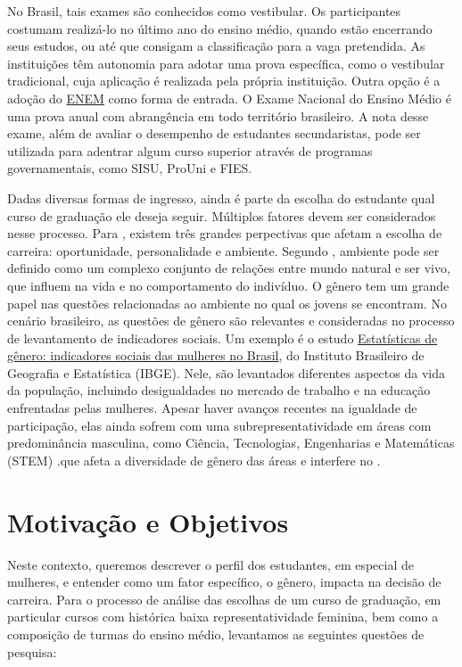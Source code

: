 No Brasil, tais exames são conhecidos como vestibular. Os participantes costumam realizá-lo no último ano do ensino médio, quando estão encerrando seus estudos, ou até que consigam a classificação para a vaga pretendida. As instituições têm autonomia para adotar uma prova específica, como o vestibular tradicional, cuja aplicação é realizada pela própria instituição. Outra opção é a adoção do \href{https://www.gov.br/inep/pt-br/areas-de-atuacao/avaliacao-e-exames-educacionais/enem}{ENEM} como forma de entrada. O Exame Nacional do Ensino Médio é uma prova anual com abrangência em todo território brasileiro. A nota desse exame, além de avaliar o desempenho de estudantes secundaristas, pode ser utilizada para adentrar algum curso superior através de programas governamentais, como SISU, ProUni e FIES.

Dadas diversas formas de ingresso, ainda é parte da escolha do estudante qual curso de graduação ele deseja seguir. Múltiplos fatores devem ser considerados nesse processo. Para \citet{Borchert2001}, existem três grandes perpectivas que afetam a escolha de carreira: oportunidade, personalidade e ambiente. Segundo \citet{Abbagnano2012}, ambiente pode ser definido como um complexo conjunto de relações entre mundo natural e ser vivo, que influem na vida e no comportamento do indivíduo. O gênero tem um grande papel nas questões relacionadas ao ambiente no qual os jovens se encontram. No cenário brasileiro, as questões de gênero são relevantes e consideradas no processo de levantamento de indicadores sociais. Um exemplo é o estudo \href{https://biblioteca.ibge.gov.br/visualizacao/livros/liv101784_informativo.pdf}{Estatísticas de gênero: indicadores sociais das mulheres no Brasil}, do Instituto Brasileiro de Geografia e Estatística (IBGE). Nele, são levantados diferentes aspectos da vida da população, incluindo desigualdades no mercado de trabalho e na educação enfrentadas pelas mulheres. Apesar haver avanços recentes na igualdade de participação, elas ainda sofrem com uma subrepresentatividade em áreas com predominância masculina, como Ciência, Tecnologias, Engenharias e Matemáticas (STEM) \autocite{Saavedra2010}.que afeta a diversidade de gênero das áreas e interfere no . 

\section{Motivação e Objetivos}
Neste contexto, queremos descrever o perfil dos estudantes, em especial de mulheres, e entender como um fator específico, o gênero, impacta na decisão de carreira. Para o processo de análise das escolhas de um curso de graduação, em particular cursos com histórica baixa representatividade feminina, bem como a composição de turmas do ensino médio, levantamos as seguintes questões de pesquisa:

